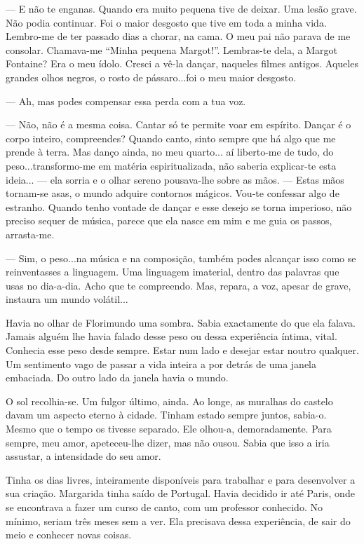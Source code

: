 --- E não te enganas. Quando era muito pequena tive de deixar. Uma lesão
grave. Não podia continuar. Foi o maior desgosto que tive em toda a
minha vida. Lembro-me de ter passado dias a chorar, na cama. O meu pai
não parava de me consolar. Chamava-me ``Minha pequena Margot!''.
Lembras-te dela, a Margot Fontaine? Era o meu ídolo. Cresci a vê-la
dançar, naqueles filmes antigos. Aqueles grandes olhos negros, o rosto
de pássaro...foi o meu maior desgosto.

--- Ah, mas podes compensar essa perda com a tua voz.

--- Não, não é a mesma coisa. Cantar só te permite voar em espírito.
Dançar é o corpo inteiro, compreendes? Quando canto, sinto sempre que há
algo que me prende à terra. Mas danço ainda, no meu quarto... aí
liberto-me de tudo, do peso...transformo-me em matéria espiritualizada,
não saberia explicar-te esta ideia... --- ela sorria e o olhar sereno
pousava-lhe sobre as mãos. --- Estas mãos tornam-se asas, o mundo adquire
contornos mágicos. Vou-te confessar algo de estranho. Quando tenho
vontade de dançar e esse desejo se torna imperioso, não preciso sequer
de música, parece que ela nasce em mim e me guia os passos, arrasta-me.

--- Sim, o peso...na música e na composição, também podes alcançar isso
como se reinventasses a linguagem. Uma linguagem imaterial, dentro das
palavras que usas no dia-a-dia. Acho que te compreendo. Mas, repara, a
voz, apesar de grave, instaura um mundo volátil...

Havia no olhar de Florimundo uma sombra. Sabia exactamente do que ela
falava. Jamais alguém lhe havia falado desse peso ou dessa experiência
íntima, vital. Conhecia esse peso desde sempre. Estar num lado e desejar
estar noutro qualquer. Um sentimento vago de passar a vida inteira a por
detrás de uma janela embaciada. Do outro lado da janela havia o mundo.

O sol recolhia-se. Um fulgor último, ainda. Ao longe, as muralhas do
castelo davam um aspecto eterno à cidade. Tinham estado sempre juntos,
sabia-o. Mesmo que o tempo os tivesse separado. Ele olhou-a,
demoradamente. Para sempre, meu amor, apeteceu-lhe dizer, mas não ousou.
Sabia que isso a iria assustar, a intensidade do seu amor.

Tinha os dias livres, inteiramente disponíveis para trabalhar e para
desenvolver a sua criação. Margarida tinha saído de Portugal. Havia
decidido ir até Paris, onde se encontrava a fazer um curso de canto, com
um professor conhecido. No mínimo, seriam três meses sem a ver. Ela
precisava dessa experiência, de sair do meio e conhecer novas coisas.

